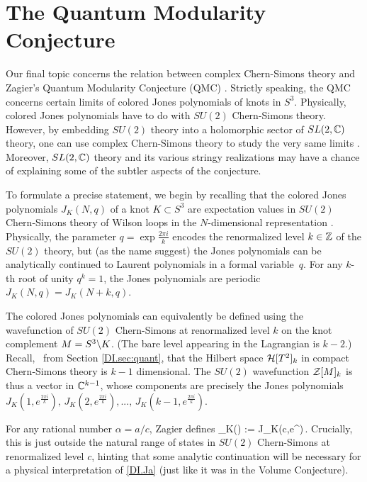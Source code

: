 \documentclass[12pt]{article}
\begin{document}
\section{The Quantum Modularity Conjecture}
\label{DI.sec:QM}

Our final topic concerns the relation between complex Chern-Simons theory and Zagier's Quantum Modularity Conjecture (QMC) \cite{DIQMF}. Strictly speaking, the QMC concerns certain limits of colored Jones polynomials of knots in $S^3$. Physically, colored Jones polynomials have to do with $SU(2)$ Chern-Simons theory. However, by embedding $SU(2)$ theory into a holomorphic sector of $SL(2,{\mathbb C})$ theory, one can use complex Chern-Simons theory to study the very same limits \cite{DIDG-levelk}. Moreover, $SL(2,{\mathbb C})$ theory and its various stringy realizations may have a chance of explaining some of the subtler aspects of the conjecture.


To formulate a precise statement, we begin by recalling that the colored Jones polynomials $J_K(N,q)$ of a knot $K\subset S^3$ are expectation values in $SU(2)$ Chern-Simons theory of Wilson loops in the $N$-dimensional representation \cite{DIJones, DITuraev-YB, DIWit-Jones}. Physically, the parameter $q=\exp\tfrac{2\pi i}{k}$ encodes the renormalized level $k\in {\mathbb Z}$ of the $SU(2)$ theory, but (as the name suggest) the Jones polynomials can be analytically continued to Laurent polynomials in a formal variable~$q$. For any $k$-th root of unity $q^k=1$, the Jones polynomials are periodic $J_K(N,q)=J_K(N+k,q)$.

The colored Jones polynomials can equivalently be defined using the wavefunction of $SU(2)$ Chern-Simons at renormalized level $k$ on the knot complement $M=S^3\backslash K$. (The bare level appearing in the Lagrangian is $k-2$.) Recall, \DIeg\ from Section \ref{DI.sec:quant}, that the Hilbert space $\mathcal{H}[T^2]_k$ in compact Chern-Simons theory is $k-1$ dimensional. The $SU(2)$ wavefunction $\mathcal{Z}[M]_k$ is thus a vector in ${\mathbb C}^{k-1}$, whose components are precisely the Jones polynomials $J_K(1,e^{\frac{2\pi i}{k}}),\,J_K(2,e^{\frac{2\pi i}{k}}),...,\,J_K(k-1,e^{\frac{2\pi i}{k}})$.




For any rational number $\alpha=a/c$, Zagier defines
%
\DIbe \CalJ_K(\alpha) := J_K(c,e^{})\,. \label{DI.Ja} \DIee
%
Crucially, this is just outside the natural range of states in $SU(2)$ Chern-Simons at renormalized level $c$, hinting that some analytic continuation will be necessary for a physical interpretation of \eqref{DI.Ja} (just like it was in the Volume Conjecture).
\end{document}
